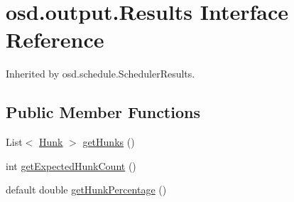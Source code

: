\hypertarget{interfaceosd_1_1output_1_1_results}{\section{osd.\-output.\-Results Interface Reference}
\label{interfaceosd_1_1output_1_1_results}
}


Inherited by osd.\-schedule.\-Scheduler\-Results.

\subsection*{Public Member Functions}
\begin{DoxyCompactItemize}
\item 
List$<$ \hyperlink{classosd_1_1output_1_1_hunk}{Hunk} $>$ \hyperlink{interfaceosd_1_1output_1_1_results_ab3ba5d6fbb97e579c73f065a39eeba94}{get\-Hunks} ()
\item 
int \hyperlink{interfaceosd_1_1output_1_1_results_a6c75f1e38400b3b8c6173e8868a27c8f}{get\-Expected\-Hunk\-Count} ()
\item 
default double \hyperlink{interfaceosd_1_1output_1_1_results_a8d94342ed8cf15db06ad480a4be65732}{get\-Hunk\-Percentage} ()
\end{DoxyCompactItemize}


